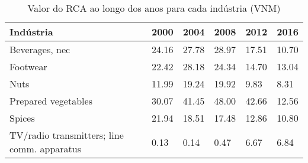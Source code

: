 \begin{table}
\centering
\caption{Valor do RCA ao longo dos anos para cada indústria (VNM)}
\begin{tabular}{p{6cm}p{1.5cm}p{1.5cm}p{1.5cm}p{1.5cm}p{1.5cm}}
\toprule
                                  Indústria &  2000 &  2004 &  2008 &  2012 &  2016 \\
\midrule
                             Beverages, nec & 24.16 & 27.78 & 28.97 & 17.51 & 10.70 \\
                                   Footwear & 22.42 & 28.18 & 24.34 & 14.70 & 13.04 \\
                                       Nuts & 11.99 & 19.24 & 19.92 &  9.83 &  8.31 \\
                        Prepared vegetables & 30.07 & 41.45 & 48.00 & 42.66 & 12.56 \\
                                     Spices & 21.94 & 18.51 & 17.48 & 12.86 & 10.80 \\
TV/radio transmitters; line comm. apparatus &  0.13 &  0.14 &  0.47 &  6.67 &  6.84 \\
\bottomrule
\end{tabular}
\end{table}
